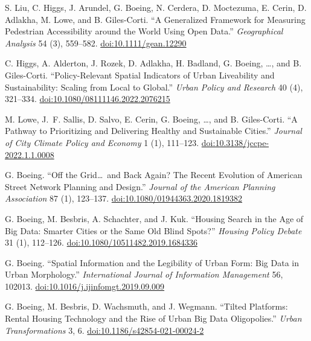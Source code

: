 \documentclass[11pt,letterpaper]{report} %
\begin{document}
\begin{tablist}
\item[2022] \tab{}S. Liu, C. Higgs, J. Arundel, G. Boeing, N. Cerdera, D. Moctezuma, E. Cerin, D. Adlakha, M. Lowe, and B. Giles-Corti. \enquote{A Generalized Framework for Measuring Pedestrian Accessibility around the World Using Open Data.} \textit{Geographical Analysis} 54 (3), 559--582. \href{https://doi.org/10.1111/gean.12290}{doi:10.1111/gean.12290}

\item[2022] \tab{}C. Higgs, A. Alderton, J. Rozek, D. Adlakha, H. Badland, G. Boeing, \ldots, and B. Giles-Corti. \enquote{Policy-Relevant Spatial Indicators of Urban Liveability and Sustainability: Scaling from Local to Global.} \textit{Urban Policy and Research} 40 (4), 321--334. \href{https://doi.org/10.1080/08111146.2022.2076215}{doi:10.1080/08111146.2022.2076215}

\item[2022] \tab{}M. Lowe, J.~F. Sallis, D. Salvo, E. Cerin, G. Boeing, \ldots, and B. Giles-Corti. \enquote{A Pathway to Prioritizing and Delivering Healthy and Sustainable Cities.} \textit{Journal of City Climate Policy and Economy} 1 (1), 111--123. \href{https://doi.org/10.3138/jccpe-2022.1.1.0008}{doi:10.3138/jccpe-2022.1.1.0008}

\item[2021] \tab{}G. Boeing. \enquote{Off the Grid\ldots\ and Back Again? The Recent Evolution of American Street Network Planning and Design.} \textit{Journal of the American Planning Association} 87 (1), 123--137. \href{https://doi.org/10.1080/01944363.2020.1819382}{doi:10.1080/01944363.2020.1819382}

\item[2021] \tab{}G. Boeing, M. Besbris, A. Schachter, and J. Kuk. \enquote{Housing Search in the Age of Big Data: Smarter Cities or the Same Old Blind Spots?} \textit{Housing Policy Debate} 31 (1), 112--126. \href{https://doi.org/10.1080/10511482.2019.1684336}{doi:10.1080/10511482.2019.1684336}

\item[2021] \tab{}G. Boeing. \enquote{Spatial Information and the Legibility of Urban Form: Big Data in Urban Morphology.} \textit{International Journal of Information Management} 56, 102013. \href{https://doi.org/10.1016/j.ijinfomgt.2019.09.009}{doi:10.1016/j.ijinfomgt.2019.09.009}

\item[2021] \tab{}G. Boeing, M. Besbris, D. Wachsmuth, and J. Wegmann. \enquote{Tilted Platforms: Rental Housing Technology and the Rise of Urban Big Data Oligopolies.} \textit{Urban Transformations} 3, 6. \href{https://doi.org/10.1186/s42854-021-00024-2}{doi:10.1186/s42854-021-00024-2}


\end{tablist}
\end{document}
